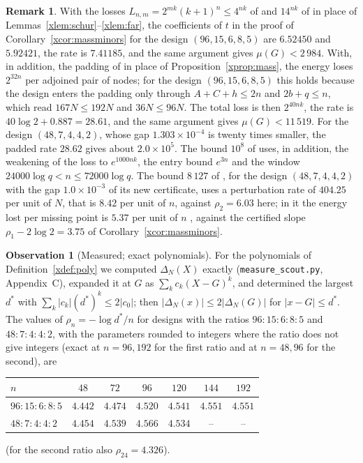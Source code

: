 \documentclass[11pt]{article}
\theoremstyle{definition}
\newtheorem{remark}[theorem]{Remark}
\newtheorem{observation}[theorem]{Observation}
\begin{document}
\begin{remark}
With the losses $L_{n,m}=2^{mk}(k+1)^n\le4^{nk}$ of \cite[Lemma~4.1, Corollary~4.2]{Jha} and $14^{nk}$ of \cite[Lemma~4.5]{Jha} in place of Lemmas~\ref{xlem:schur}--\ref{xlem:far}, the coefficients of $t$ in the proof of Corollary~\ref{xcor:massminors} for the design $(96,15,6,8,5)$ are $6.52450$ and $5.92421$, the rate is $7.41185$, and the same argument gives $\mu(G)<2\,984$. With, in addition, the padding of \cite[Proposition~5.4]{Jha} in place of Proposition~\ref{xprop:mass}, the energy loses $2^{32n}$ per adjoined pair of nodes; for the design $(96,15,6,8,5)$ this holds because the design enters the padding only through $A+C+h\le2n$ and $2b+q\le n$, which read $167N\le192N$ and $36N\le96N$. The total loss is then $2^{40nk}$, the rate is $40\log2+0.887=28.61$, and the same argument gives $\mu(G)<11\,519$. For the design $(48,7,4,4,2)$, whose gap $1.303\times10^{-4}$ is twenty times smaller, the padded rate $28.62$ gives about $2.0\times10^5$. The bound $10^8$ of \cite{Jha} uses, in addition, the weakening of the loss to $e^{1000nk}$, the entry bound $e^{3n}$ and the window $24000\log q<n\le72000\log q$. The bound $8\,127$ of \cite{Litsey}, for the design $(48,7,4,4,2)$ with the gap $1.0\times10^{-3}$ of its new certificate, uses a perturbation rate of $404.25$ per unit of $N$, that is $8.42$ per unit of $n$, against $\rho_2=6.03$ here; in it the energy lost per missing point is $5.37$ per unit of $n$ \cite[Proposition~5.10]{Litsey}, against the certified slope $\rho_1-2\log2=3.75$ of Corollary~\ref{xcor:massminors}.
\end{remark}

\begin{observation}[Measured; exact polynomials]\label{xobs:radius}
For the polynomials of Definition~\ref{xdef:poly} we computed $\Delta_N(X)$ exactly (\texttt{measure\_scout.py}, Appendix~C), expanded it at $G$ as $\sum_kc_k(X-G)^k$, and determined the largest $d^*$ with $\sum_k|c_k|(d^*)^k\le2|c_0|$; then $|\Delta_N(x)|\le2|\Delta_N(G)|$ for $|x-G|\le d^*$. The values of $\rho_n=-\log d^*/n$ for designs with the ratios $96:15:6:8:5$ and $48:7:4:4:2$, with the parameters rounded to integers where the ratio does not give integers (exact at $n=96,192$ for the first ratio and at $n=48,96$ for the second), are
\begin{center}
\begin{tabular}{lcccccc}
\toprule
$n$ & $48$ & $72$ & $96$ & $120$ & $144$ & $192$\\
\midrule
$96:15:6:8:5$ & $4.442$ & $4.474$ & $4.520$ & $4.541$ & $4.551$ & $4.551$\\
$48:7:4:4:2$ & $4.454$ & $4.539$ & $4.566$ & $4.534$ & -- & --\\
\bottomrule
\end{tabular}
\end{center}
(for the second ratio also $\rho_{24}=4.326$).
\end{observation}
\end{document}
